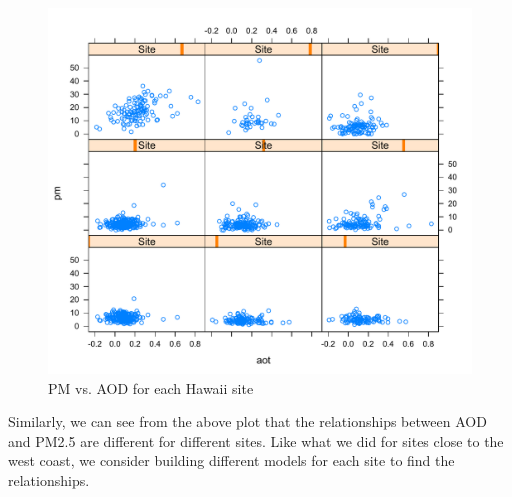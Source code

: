 \documentclass[12pt]{article}
\begin{document}
\begin{figure}[!h]
\centering
\includegraphics[width=\linewidth]{1.pdf}
\caption{PM vs. AOD for each Hawaii site}
\label{fig3.4}
\end{figure}

Similarly, we can see from the above plot that the relationships between AOD and PM2.5 are different for different sites. Like what we did for sites close to the west coast, we consider building different models for each site to find the relationships.




%
\end{document}
